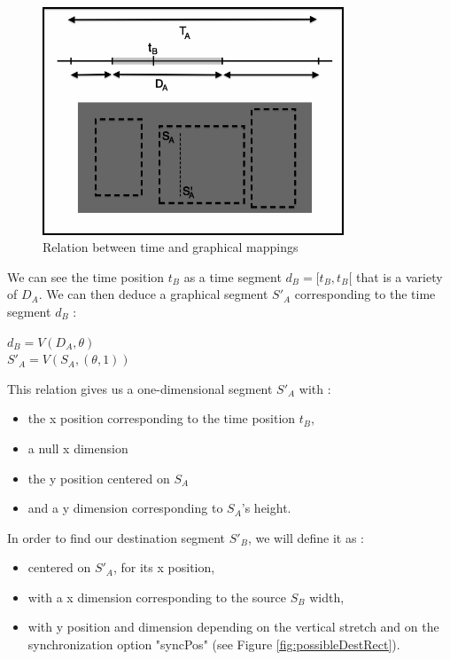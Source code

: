 \documentclass[a4paper]{article}
\begin{document}
\begin{figure}[h]
\begin{center}
\includegraphics[width=9cm]{img/time_graphic3.png}
\caption{Relation between time and graphical mappings}
\label{fig:time2graphic}
\end{center}
\end{figure}

We can see the time position $t_B$ as a time segment $d_B = [t_B, t_B[$ that is a variety of $D_A$. We can then deduce a graphical segment $S'_A$ corresponding to the time segment $d_B$ :

\begin{center}
$d_B = V(D_A, \theta)$\\
$S'_A = V(S_A, (\theta, 1))$
\end{center}

This relation gives us a one-dimensional segment $S'_A$ with :
\begin{itemize}
  \item the x position corresponding to the time position $t_B$, 
  \item a null x dimension
  \item the y position centered on $S_A$
  \item and a y dimension corresponding to $S_A$'s height.
\end{itemize} 


In order to find our destination segment $S'_B$, we will define it as :
\begin{itemize}
  \item centered on $S'_A$, for its x position,
  \item with a x dimension corresponding to the source $S_B$ width,
  \item with y position and dimension depending on the vertical stretch and on the synchronization option "syncPos" (see Figure \ref{fig:possibleDestRect}).
\end{itemize}
\end{document}

